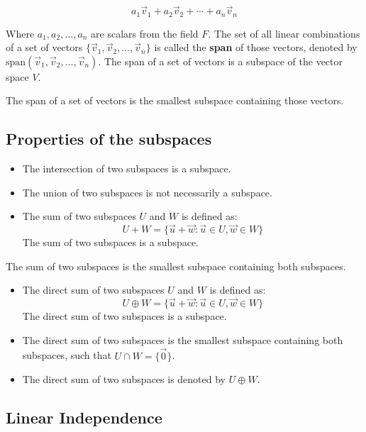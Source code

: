 \[
	a_1\vec{v}_1 + a_2\vec{v}_2 + \cdots + a_n\vec{v}_n
\]

Where \(a_1, a_2, \ldots, a_n\) are scalars from the field \(F\).
The set of all linear combinations of a set of vectors \(\{\vec{v}_1, \vec{v}_2, \ldots, \vec{v}_n\}\) 
is called the \textbf{span} of those vectors, 
denoted by \(\text{span}(\vec{v}_1, \vec{v}_2, \ldots, \vec{v}_n)\). The span of a set of vectors is a 
subspace of the vector space \(V\).

The span of a set of vectors is the smallest subspace containing those vectors.

\subsection{Properties of the subspaces}

\begin{itemize}

	\item The intersection of two subspaces is a subspace.

	\item The union of two subspaces is not necessarily a subspace.

	\item The sum of two subspaces \(U\) and \(W\) is defined as:
	      \[
		      U + W = \{\vec{u} + \vec{w} : \vec{u} \in U, \vec{w} \in W\}
	      \]
	      The sum of two subspaces is a subspace.

		\end{itemize}

The sum of two subspaces is the smallest subspace containing both subspaces.

\begin{itemize}

	\item The direct sum of two subspaces \(U\) and \(W\) is defined as:
	      \[
		      U \oplus W = \{\vec{u} + \vec{w} : \vec{u} \in U, \vec{w} \in W\}
	      \]
	      The direct sum of two subspaces is a subspace.

	\item The direct sum of two subspaces is the smallest subspace containing both subspaces, such that 
		  \(U \cap W = \{\vec{0}\}\).

	\item The direct sum of two subspaces is denoted by \(U \oplus W\).

\end{itemize}

\subsection{Linear Independence}

